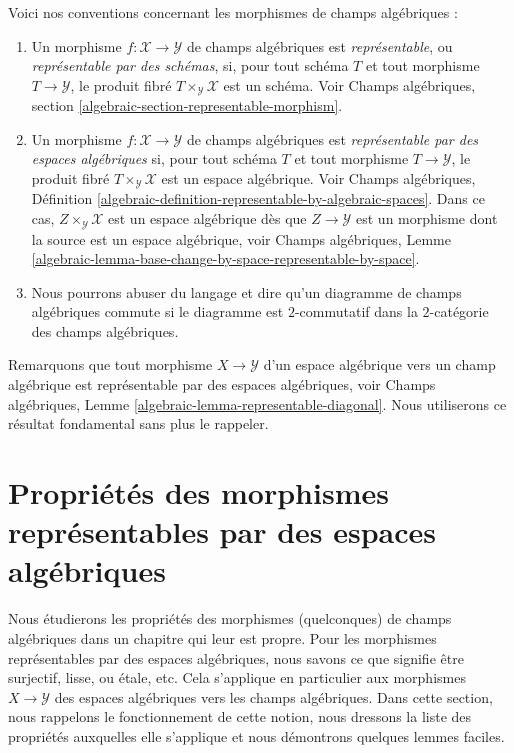 Voici nos conventions concernant les morphismes de champs algébriques :
\begin{enumerate}
\item Un morphisme $f : \mathcal{X} \to \mathcal{Y}$
de champs algébriques est {\it représentable}, ou
{\it représentable par des schémas}, si, pour tout schéma
$T$ et tout morphisme $T \to \mathcal{Y}$, le produit fibré
$T \times_\mathcal{Y} \mathcal{X}$ est un schéma.
Voir
Champs algébriques, section \ref{algebraic-section-representable-morphism}.
\item Un morphisme $f : \mathcal{X} \to \mathcal{Y}$
de champs algébriques est {\it représentable par des espaces algébriques}
si, pour tout schéma $T$ et tout morphisme $T \to \mathcal{Y}$, le produit fibré
$T \times_\mathcal{Y} \mathcal{X}$ est un espace algébrique.
Voir Champs algébriques,
Définition \ref{algebraic-definition-representable-by-algebraic-spaces}.
Dans ce cas, $Z \times_\mathcal{Y} \mathcal{X}$ est un espace
algébrique dès que $Z \to \mathcal{Y}$ est un morphisme dont la source est
un espace algébrique, voir
Champs algébriques,
Lemme \ref{algebraic-lemma-base-change-by-space-representable-by-space}.
\item Nous pourrons abuser du langage et dire qu'un diagramme de champs algébriques
commute si le diagramme est $2$-commutatif dans la $2$-catégorie des
champs algébriques.
\end{enumerate}
Remarquons que tout morphisme $X \to \mathcal{Y}$ d'un espace algébrique
vers un champ algébrique est représentable par des espaces algébriques, voir
Champs algébriques, Lemme \ref{algebraic-lemma-representable-diagonal}.
Nous utiliserons ce résultat fondamental sans plus le rappeler.




\section{Propriétés des morphismes représentables par des espaces algébriques}
\label{section-properties-morphisms}

\noindent
Nous étudierons les propriétés des morphismes (quelconques) de champs algébriques
dans un chapitre qui leur est propre. Pour les morphismes représentables par des espaces algébriques, nous savons ce que
signifie être surjectif, lisse, ou \'etale, etc. Cela s'applique en particulier
aux morphismes $X \to \mathcal{Y}$ des espaces algébriques vers les champs algébriques.
Dans cette section, nous rappelons le fonctionnement de cette notion, nous dressons la liste des propriétés
auxquelles elle s'applique et nous démontrons quelques lemmes faciles.

